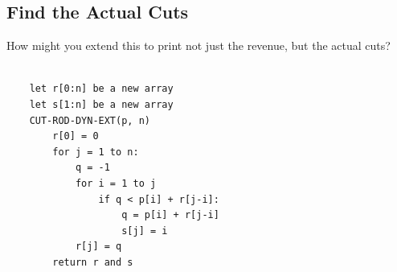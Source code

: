 \documentclass[]{article}
\begin{document}
\subsection*{Find the Actual Cuts}

How might you extend this to print not just the revenue, but the actual cuts? 

\begin{verbatim}
     
    let r[0:n] be a new array
    let s[1:n] be a new array
    CUT-ROD-DYN-EXT(p, n)
        r[0] = 0
        for j = 1 to n:
            q = -1
            for i = 1 to j
                if q < p[i] + r[j-i]:
                    q = p[i] + r[j-i]
                    s[j] = i
            r[j] = q
        return r and s

\end{verbatim}
\end{document}

